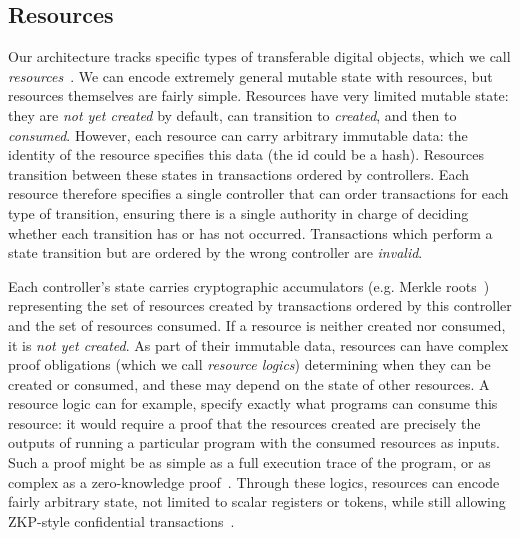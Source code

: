 \documentclass[a4paper,USenglish,cleveref, autoref, thm-restate, anonymous]{lipics-v2021}
\begin{document}
\subsection{Resources}
Our architecture tracks specific types of transferable digital objects, which we call \emph{resources}~\cite{resource}.
We can encode extremely general mutable state with resources, but resources themselves are fairly simple.
Resources have very limited mutable state: they are \emph{not yet created} by default, can transition to \emph{created}, and then to \emph{consumed}.
However, each resource can carry arbitrary immutable data: the identity of the resource specifies this data (the id could be a hash).
Resources transition between these states in transactions ordered by controllers.
Each resource therefore specifies a single controller that can order transactions for each type of transition, ensuring there is a single authority in charge of deciding whether each transition has or has not occurred.
Transactions which perform a state transition but are ordered by the wrong controller are \emph{invalid}.

Each controller's state carries cryptographic accumulators (e.g. Merkle roots~\cite{merkle}) representing the set of resources created by transactions ordered by this controller and the set of resources consumed.
If a resource is neither created nor consumed, it is \emph{not yet created}.
As part of their immutable data, resources can have complex proof obligations (which we call \emph{resource logics}) determining when they can be created or consumed, and these may depend on the state of other resources. %
A resource logic can for example, specify exactly what programs can consume this resource: it would require a proof that the resources created are precisely the outputs of running a particular program with the consumed resources as inputs.
Such a proof might be as simple as a full execution trace of the program, or as complex as a zero-knowledge proof~\cite{nova}.
Through these logics, resources can encode fairly arbitrary state, not limited to scalar registers or tokens, while still allowing ZKP-style confidential transactions~\cite{resource}.
\end{document}
